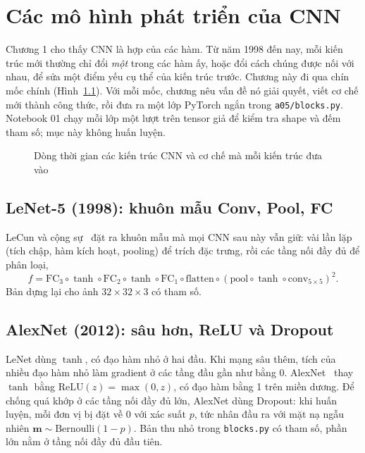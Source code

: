 \chapter{Các mô hình phát triển của CNN}
\label{ch:kientruc}

Chương 1 cho thấy CNN là hợp của các hàm. Từ năm 1998 đến nay, mỗi kiến trúc mới thường chỉ đổi \emph{một}
trong các hàm ấy, hoặc đổi cách chúng được nối với nhau, để sửa một điểm yếu cụ thể của kiến trúc trước.
Chương này đi qua chín mốc chính (Hình~\ref{fig:dongthoigian}). Với mỗi mốc, chương nêu vấn đề nó giải quyết,
viết cơ chế mới thành công thức, rồi đưa ra một lớp PyTorch ngắn trong \texttt{a05/blocks.py}. Notebook 01
chạy mỗi lớp một lượt trên tensor giả để kiểm tra shape và đếm tham số; mục này không huấn luyện.

\begin{figure}[H]
  \centering
  \caption{Dòng thời gian các kiến trúc CNN và cơ chế mà mỗi kiến trúc đưa vào}
  \label{fig:dongthoigian}
\end{figure}

\section{LeNet-5 (1998): khuôn mẫu Conv, Pool, FC}

LeCun và cộng sự~\cite{lecun1998} đặt ra khuôn mẫu mà mọi CNN sau này vẫn giữ: vài lần lặp
(tích chập, hàm kích hoạt, pooling) để trích đặc trưng, rồi các tầng nối đầy đủ để phân loại,
\[
  f = \mathrm{FC}_3\circ\tanh\circ\mathrm{FC}_2\circ\tanh\circ\mathrm{FC}_1\circ\mathrm{flatten}\circ
      (\mathrm{pool}\circ\tanh\circ\mathrm{conv}_{5\times5})^{2}.
\]
Bản dựng lại cho ảnh $32\times32\times3$ có  tham số.


\section{AlexNet (2012): sâu hơn, ReLU và Dropout}

LeNet dùng $\tanh$, có đạo hàm nhỏ ở hai đầu. Khi mạng sâu thêm, tích của nhiều đạo hàm nhỏ làm gradient
ở các tầng đầu gần như bằng 0. AlexNet~\cite{krizhevsky2012} thay $\tanh$ bằng $\mathrm{ReLU}(z)=\max(0,z)$,
có đạo hàm bằng 1 trên miền dương. Để chống quá khớp ở các tầng nối đầy đủ lớn, AlexNet dùng Dropout:
khi huấn luyện, mỗi đơn vị bị đặt về 0 với xác suất $p$, tức nhân đầu ra với mặt nạ ngẫu nhiên
$\mathbf{m}\sim\mathrm{Bernoulli}(1-p)$. Bản thu nhỏ trong \texttt{blocks.py} có 
tham số, phần lớn nằm ở tầng nối đầy đủ đầu tiên.

